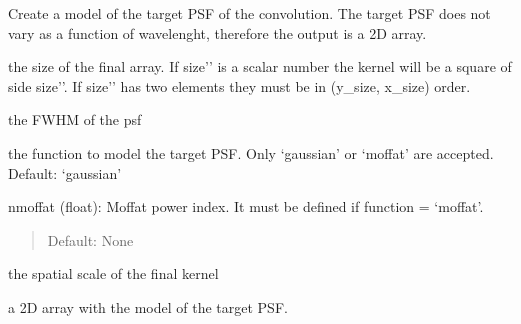 \documentclass[letterpaper,10pt,english]{sphinxmanual}
\begin{document}

\begin{fulllineitems}
\label{\detokenize{api/pymusepipe:pymusepipe.cube_convolve.psf2d}}
\pysigstartsignatures
{}
\pysigstopsignatures
\sphinxAtStartPar
Create a model of the target PSF of the convolution. The target PSF does
not vary as a function of wavelenght, therefore the output is a 2D array.
\begin{description}
\begin{description}
\sphinxAtStartPar
the size of the final array. If {\color{red}\bfseries{}\textasciigrave{}\textasciigrave{}}size’’ is a scalar number the
kernel will be a square of side {\color{red}\bfseries{}\textasciigrave{}\textasciigrave{}}size’’. If {\color{red}\bfseries{}\textasciigrave{}\textasciigrave{}}size’’ has two
elements they must be in (y\_size, x\_size) order.

\sphinxAtStartPar
the FWHM of the psf

\sphinxAtStartPar
the function to model the target PSF. Only ‘gaussian’ or ‘moffat’
are accepted. Default: ‘gaussian’

\end{description}

\sphinxAtStartPar
nmoffat (float): Moffat power index. It must be defined if
function = ‘moffat’.
\begin{quote}

\sphinxAtStartPar
Default: None
\end{quote}
\begin{description}
\sphinxAtStartPar
the spatial scale of the final kernel

\end{description}

\begin{description}
\sphinxAtStartPar
a 2D array with the model of the target PSF.

\end{description}

\end{description}

\end{fulllineitems}
\end{document}

